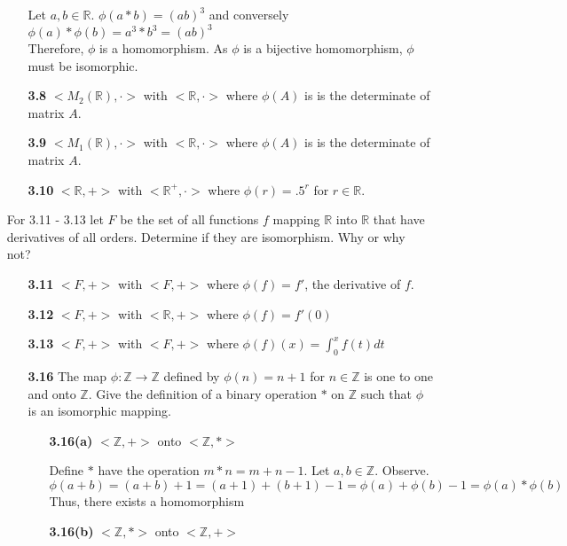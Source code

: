 \documentclass[11pt]{article}
\theoremstyle{plain}
\theoremstyle{definition}
\newcommand{\R}{\mathbb{R}}
\newcommand{\Z}{\mathbb{Z}}
\begin{document}
\begin{enumerate}
\begin{enumerate}
			Let $a,b \in \R \text{. } \phi(a * b) = (ab)^3$ and conversely $\phi(a)*\phi(b) = a^3*b^3 = (ab)^3$ \\
			Therefore, $\phi$ is a homomorphism.
			As $\phi$ is a bijective homomorphism, $\phi$ must be isomorphic.
        \item[\textbf{3.8}] $<M_2(\R),\cdot>$ with $<\R,\cdot>$ where $\phi(A)$ is is the determinate of matrix $A$.
        
        \item[\textbf{3.9}] $<M_1(\R),\cdot>$ with $<\R,\cdot>$ where $\phi(A)$ is is the determinate of matrix $A$.
        
        \item[\textbf{3.10}] $<\R,+>$ with $<\R^+,\cdot>$ where $\phi (r) = .5^r$ for $r \in \R$.
    
    \end{enumerate}
    
    For 3.11 - 3.13 let $F$ be the set of all functions $f$ mapping $\R$ into $\R$ that have derivatives of all orders. Determine if they are isomorphism. Why or why not?
    
    \begin{enumerate}
        
        \item[\textbf{3.11}] $<F,+>$ with $<F,+>$ where $\phi(f) = f'$, the derivative of $f$.
        
        \item[\textbf{3.12}] $<F,+>$ with $<\R,+>$ where $\phi(f) = f'(0)$
        
        \item[\textbf{3.13}] $<F,+>$ with $<F,+>$ where $\phi(f)(x) = \int_0^xf(t)dt $ 
        
        \item[\textbf{3.16}] The map $\phi: \Z \rightarrow \Z$ defined by $\phi (n) = n+1$ for $n \in \Z$ is one to one and onto $\Z$. Give the definition of a binary operation $*$ on $\Z$ such that $\phi$ is an isomorphic mapping.
           \begin{enumerate}
                \item[\textbf{3.16(a)}]
                $<\Z,+>$ onto $<\Z,\ast>$
                
                Define $\ast$ have the operation $m\ast n = m + n - 1$. Let $a,b \in \Z$. Observe. 
                \[\phi(a+b) = (a+b) + 1 = (a + 1) + (b + 1) - 1 = \phi(a) + \phi(b) - 1 = \phi(a)\ast \phi(b)\]
                Thus, there exists a homomorphism 
                \item[\textbf{3.16(b)}]
                $<\Z,\ast>$ onto $<\Z,+>$
                

\end{enumerate}
\end{enumerate}
\end{enumerate}
\end{document}
